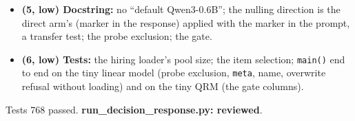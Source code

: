 \documentclass{article}
\begin{document}
\begin{itemize}
        read from the marked prompt, untouched. Gated heads now also get \texttt{gate\_fixed} (the verdicts
        rescored with the gate of the same record's unmarked decision prompt: the last-token pathway alone) and
        \texttt{nulled\_gate\_fixed} (both pathways removed), with intervals; new
        \texttt{pairs.verdicts.unmarked\_decision\_prompt}. Scoring now goes through
        \texttt{embed\_with\_gates}/\texttt{rewards\_from\_hidden}, as elsewhere.
  \item \textbf{(5, low) Docstring:} no ``default Qwen3-0.6B''; the nulling direction is the direct arm's (marker in
        the response) applied with the marker in the prompt, a transfer test; the probe exclusion; the gate.
  \item \textbf{(6, low) Tests:} the hiring loader's pool size; the item selection; \texttt{main()} end to end on the
        tiny linear model (probe exclusion, \texttt{meta}, name, overwrite refusal without loading) and on the tiny
        QRM (the gate columns).
\end{itemize}
Tests 768 passed. \textbf{run\_decision\_response.py: reviewed}.
\end{document}
